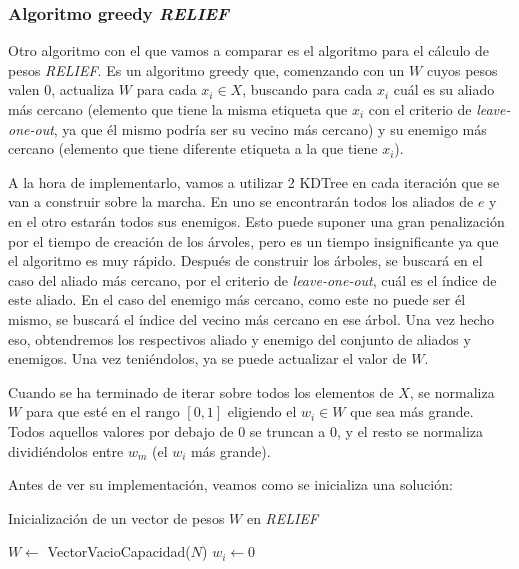 \documentclass[11pt,a4paper]{article}
\begin{document}
\newpage

\subsubsection{Algoritmo greedy \textit{RELIEF}}

Otro algoritmo con el que vamos a comparar es el algoritmo para el cálculo de pesos \textit{RELIEF}. Es un algoritmo
greedy que, comenzando con un $W$ cuyos pesos valen 0, actualiza $W$ para cada $x_i \in X$, buscando para cada $x_i$ cuál es
su aliado más cercano (elemento que tiene la misma etiqueta que $x_i$ con el criterio de \textit{leave-one-out}, ya que él
mismo podría ser su vecino más cercano) y su enemigo más cercano (elemento que tiene diferente etiqueta a la que tiene $x_i$).

A la hora de implementarlo, vamos a utilizar 2 KDTree en cada iteración que se van a construir sobre la marcha. En uno se
encontrarán todos los aliados de $e$ y en el otro estarán todos sus enemigos. Esto puede suponer una gran penalización por el
tiempo de creación de los árvoles, pero es un tiempo insignificante ya que el algoritmo es muy rápido. Después de construir los
árboles, se buscará en el caso del aliado más cercano, por el criterio de \textit{leave-one-out}, cuál es el índice de este
aliado. En el caso del enemigo más cercano, como este no puede ser él mismo, se buscará el índice del vecino más cercano en ese
árbol. Una vez hecho eso, obtendremos los respectivos aliado y enemigo del conjunto de aliados y enemigos. Una vez teniéndolos,
ya se puede actualizar el valor de $W$.

Cuando se ha terminado de iterar sobre todos los elementos de $X$, se normaliza $W$ para que esté en el rango $[0, 1]$ 
eligiendo el $w_i \in W$ que sea más grande. Todos aquellos valores por debajo de 0 se truncan a 0, y el resto se normaliza
dividiéndolos entre $w_m$ (el $w_i$ más grande).

Antes de ver su implementación, veamos como se inicializa una solución:

\begin{algorithm}[H]
\caption{Inicialización de un vector de pesos $W$ en \textit{RELIEF}}
\begin{algorithmic}[1]
\State $W \gets$ VectorVacioCapacidad($N$)
	\State $w_i \gets 0$
\EndFor
\State {}
\EndFunction
\end{algorithmic}
\end{algorithm}
\end{document}
